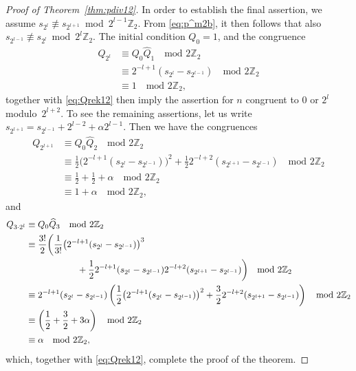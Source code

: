 \documentclass[12pt,reqno]{amsart}
\numberwithin{equation}{section}
\theoremstyle{remark}
\begin{document}
\begin{proof}[Proof of Theorem~{\em \ref{thm:pdiv12}}]
In order to establish the final assertion, we assume
\hbox{$s_{2^{l}}\not\equiv s_{2^{l+1}}$~{mod~$2^{l-1}{\mathbb{Z}}_2$}}.
From \eqref{eq:p^m2b}, it then follows that also
\hbox{$s_{2^{l-1}}\not\equiv s_{2^{l}}$~{mod~$2^{l}{\mathbb{Z}}_2$}}.
The initial condition $Q_0=1$, and the congruence
\begin{align*}
Q_{2^{l}}&\equiv Q_{0}\widehat Q_1\quad \text{mod $2{\mathbb{Z}}_2$}\\
&\equiv 2^{-l+1}(s_{2^l}-s_{2^{l-1}})\quad \text{mod $2{\mathbb{Z}}_2$}\\
&\equiv 1\quad \text{mod $2{\mathbb{Z}}_2$},
\end{align*}
together with \eqref{eq:Qrek12} then imply the assertion for $n$
congruent to $0$ or $2^l$ modulo~$2^{l+2}$. To see the remaining
assertions, let us write $s_{2^{l+1}}=s_{2^{l-1}}+2^{l-2}+{\alpha}2^{l-1}$.
Then we have the congruences
\begin{align*}
Q_{2^{l+1}}&\equiv Q_{0}\widehat Q_2\quad \text{mod $2{\mathbb{Z}}_2$}\\
&\equiv \frac {1} {2}\big(2^{-l+1}(s_{2^l}-s_{2^{l-1}})\big)^2
+\frac {1} {2}2^{-l+2}(s_{2^{l+1}}-s_{2^{l-1}})
\quad \text{mod $2{\mathbb{Z}}_2$}\\
&\equiv \frac {1} {2}+\frac {1} {2}+{\alpha}\quad \text{mod $2{\mathbb{Z}}_2$}\\
&\equiv 1+{\alpha}\quad \text{mod $2{\mathbb{Z}}_2$},
\end{align*}
and
\begin{align*}
Q_{3\cdot2^{l}}&\equiv Q_{0}\widehat Q_3\quad \text{mod $2{\mathbb{Z}}_2$}\\
&\equiv \frac {3!} {2}
\bigg(\frac {1} {3!}\big(2^{-l+1}(s_{2^l}-s_{2^{l-1}})\big)^3\\
&\kern2cm
+\frac {1} {2}2^{-l+1}(s_{2^l}-s_{2^{l-1}})
2^{-l+2}(s_{2^{l+1}}-s_{2^{l-1}})\bigg)
\quad \text{mod $2{\mathbb{Z}}_2$}\\
&\equiv 
2^{-l+1}(s_{2^l}-s_{2^{l-1}})
\left(\frac {1} {2}\big(2^{-l+1}(s_{2^l}-s_{2^{l-1}})\big)^2
+\frac {3} {2}
2^{-l+2}(s_{2^{l+1}}-s_{2^{l-1}})\right)
\quad \text{mod $2{\mathbb{Z}}_2$}\\
&\equiv \left(\frac {1} {2}
+\frac {3} {2}+3{\alpha}
\right)
\quad \text{mod $2{\mathbb{Z}}_2$}\\
&\equiv {\alpha}
\quad \text{mod $2{\mathbb{Z}}_2$},
\end{align*}
which, together with \eqref{eq:Qrek12}, complete the proof of the theorem.
\end{proof}
\end{document}
